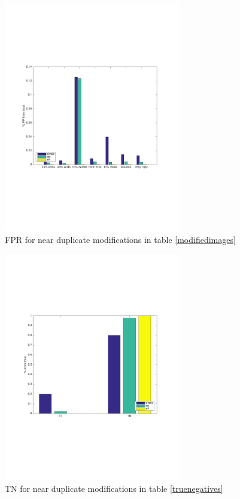 \documentclass[english,12pt,a4paper,pdftex,elec,utf8]{aaltothesis}
\begin{document}
\begin{figure}[htb]
\begin{center}
\includegraphics[height=10cm]{figures/fpBar}
\end{center}
\caption{ FPR for near duplicate modifications in table \ref{modifiedimages} }
\label{fptotal}
\end{figure}

\begin{figure}[htb]
\begin{center}
\includegraphics[height=10cm]{figures/tnBar}
\end{center}
\caption{ TN for near duplicate modifications in table \ref{truenegatives} }
\label{tntotal}
\end{figure}
\end{document}
